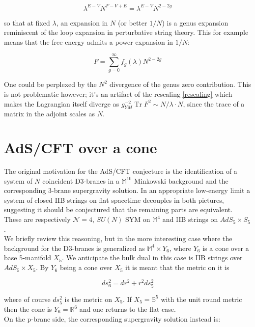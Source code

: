 \documentclass[11pt,a4paper,twoside,openright]{book}
\DeclareMathOperator{\Tr}{Tr}
\begin{document}
\[ \lambda^{E-V} N^{F-V+E} = \lambda^{E-V} N^{2-2g} \]

so that at fixed $\lambda$, an expansion in $N$ (or better $1/N$) is a genus expansion reminiscent of the loop expansion in perturbative string theory. This for example means that the free energy admits a power expansion in $1/N$:

\begin{equation}
F = \sum_{g=0}^\infty f_g(\lambda) N^{2-2g}
\end{equation}

One could be perplexed by the $N^2$ divergence of the genus zero contribution. This is not problematic however; it's an artifact of the rescaling \ref{rescaling} which makes the Lagrangian itself diverge as $g_{YM}^{-2} \Tr F^2 \sim N/\lambda \cdot N$, since the trace of a matrix in the adjoint scales as $N$.

\section{AdS/CFT over a cone}

The original motivation for the AdS/CFT conjecture is the identification of a system of $N$ coincident D3-branes in a $\mathbb{M}^{10}$ Minkowski background and the corresponding 3-brane supergravity solution. In an appropriate low-energy limit a system of closed IIB strings on flat spacetime decouples in both pictures, suggesting it should be conjectured that the remaining parts are equivalent. These are respectively $\mathcal{N}=4$, $SU(N)$ SYM on $\mathbb{M}^4$ and IIB strings on $AdS_5 \times S_5$.\\

We briefly review this reasoning, but in the more interesting case where the background for the D3-branes is generalized as $\mathbb{M}^4 \times Y_6$, where $Y_6$ is a cone over a base 5-manifold $X_5$. We anticipate the bulk dual in this case is IIB strings over $AdS_5 \times X_5$. By $Y_6$ being a cone over $X_5$ it is meant that the metric on it is

\begin{equation}
ds^2_6 = dr^2 + r^2 ds_5^2 
\end{equation}

where of course $ds_5^2$ is the metric on $X_5$. If $X_5 = \mathbb{S}^5$ with the unit round metric then the cone is $Y_6 = \mathbb{R}^6$ and one returns to the flat case.\\

On the p-brane side, the corresponding supergravity solution instead is:
\end{document}
